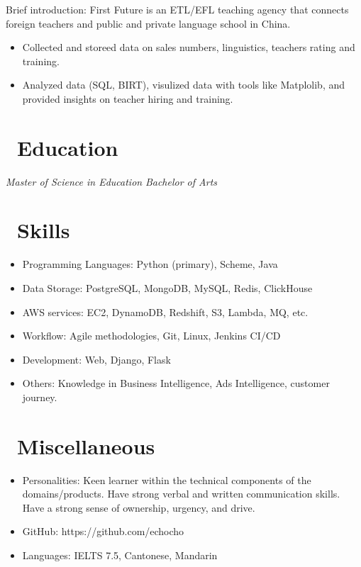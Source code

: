 \documentclass{resume}
\begin{document}
Brief introduction: First Future is an ETL/EFL teaching agency that connects foreign teachers and public and private language school in China.
\begin{itemize}
  \item Collected and storeed data on sales numbers, linguistics, teachers rating and training.
  \item Analyzed data (SQL, BIRT), visulized data with tools like Matplolib, and provided insights on teacher hiring and training.
\end{itemize}

\section{\faGraduationCap\ Education}
\textit{Master of Science in Education}
\textit{Bachelor of Arts}

\section{\faCogs\ Skills}
\begin{itemize}[parsep=0.5ex]
  \item Programming Languages: Python (primary), Scheme, Java
  \item Data Storage: PostgreSQL, MongoDB, MySQL, Redis, ClickHouse
  \item AWS services: EC2, DynamoDB, Redshift, S3, Lambda, MQ, etc.
  \item Workflow: Agile methodologies, Git, Linux, Jenkins CI/CD
  \item Development: Web, Django, Flask
  \item Others: Knowledge in Business Intelligence, Ads Intelligence, customer journey.
\end{itemize}

\section{\faInfo\ Miscellaneous}
\begin{itemize}[parsep=0.5ex]
  \item Personalities: Keen learner within the technical components of the domains/products. Have strong verbal and written communication skills. Have a strong sense of ownership, urgency, and drive.
  \item GitHub: https://github.com/echocho
  \item Languages: IELTS 7.5, Cantonese, Mandarin
\end{itemize}

%
%
\end{document}
